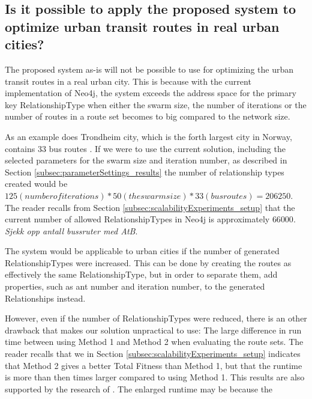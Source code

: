 

\subsection{Is it possible to apply the proposed system to optimize urban transit routes in real urban cities?}

The proposed system as-is will not be possible to use for optimizing the urban transit routes in a real urban city. This is because with the current implementation of Neo4j, the system exceeds the address space for the primary key RelationshipType when either the swarm size, the number of iterations or the number of routes in a route set becomes to big compared to the network size. 

As an example does Trondheim city, which is the forth largest city in Norway, contains 33 bus routes \citet{website:atb-linjenett}. If we were to use the current solution, including the selected parameters for the swarm size and iteration number, as described in Section \vref{subsec:parameterSettings_results} the number of relationship types created would be $125 (number of iterations) * 50 (the swarm size) * 33 (bus routes) = 206 250$. The reader recalls from Section \vref{subsec:scalabilityExperiments_setup} that the current number of allowed RelationshipTypes in Neo4j is approximately $66 000$.
\emph{\color{blue} Sjekk opp antall bussruter med AtB}.

The system would be applicable to urban cities if the number of generated RelationshipTypes were increased. This can be done by creating the routes as effectively the same RelationshipType, but in order to separate them, add properties, such as ant number and iteration number, to the generated Relationships instead.  

However, even if the number of RelationshipTypes were reduced, there is an other drawback that makes our solution unpractical to use: The large difference in run time between using Method 1 and Method 2 when evaluating the route sets. 
The reader recalls that we in Section \vref{subsec:scalabilityExperiments_setup} indicates that Method 2 gives a better Total Fitness than Method 1, but that the runtime is more than then times larger compared to using Method 1. This results are also supported by the research of \citet{fan09}. The enlarged runtime may be because the

